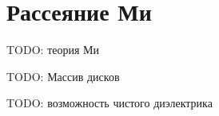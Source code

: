 \section{Рассеяние Ми}

TODO: теория Ми \cite{Mie1908, Mie1908en, Bohren1998, Jylha2006}

TODO: Массив дисков \cite{Lewin1947}

TODO: возможность чистого диэлектрика \cite{Zhao2009, Ginn2012}